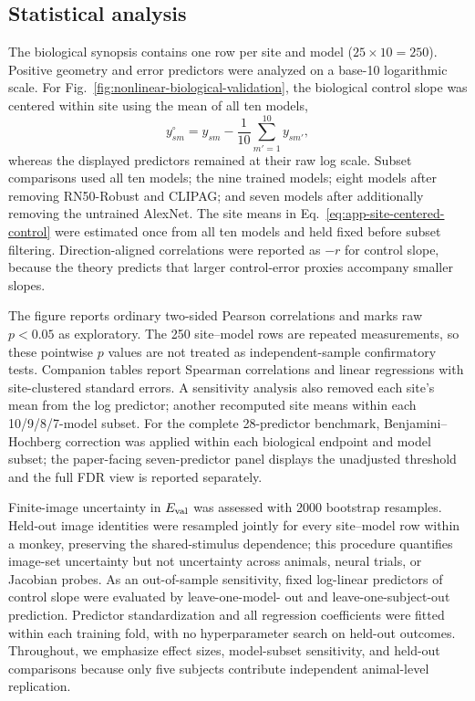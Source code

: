 \subsection{Statistical analysis}
\label{sec:app-methods-stats}
The biological synopsis contains one row per site and model ($25\times10=250$).
Positive geometry and error predictors were analyzed on a base-10 logarithmic
scale.  For Fig.~\ref{fig:nonlinear-biological-validation}, the biological
control slope was centered within site using the mean of all ten models,
\begin{equation}
 y^{\circ}_{sm}=y_{sm}-\frac{1}{10}\sum_{m'=1}^{10}y_{sm'},
 \label{eq:app-site-centered-control}
\end{equation}
whereas the displayed predictors remained at their raw log scale.  Subset
comparisons used all ten models; the nine trained models; eight models after
removing RN50-Robust and CLIPAG; and seven models after additionally removing
the untrained AlexNet.  The site means in
Eq.~\ref{eq:app-site-centered-control} were estimated once from all ten models
and held fixed before subset filtering.  Direction-aligned correlations were
reported as $-r$ for control slope, because the theory predicts that larger
control-error proxies accompany smaller slopes.

The figure reports ordinary two-sided Pearson correlations and marks raw
$p<0.05$ as exploratory.  The 250 site--model rows are repeated measurements,
so these pointwise $p$ values are not treated as independent-sample
confirmatory tests.  Companion tables report Spearman correlations and linear
regressions with site-clustered standard errors.  A sensitivity analysis also
removed each site's mean from the log predictor; another recomputed site means
within each 10/9/8/7-model subset.  For the complete 28-predictor benchmark,
Benjamini--Hochberg correction was applied within each biological endpoint and
model subset; the paper-facing seven-predictor panel displays the unadjusted
threshold and the full FDR view is reported separately.

Finite-image uncertainty in $E_{\rm val}$ was assessed with 2000 bootstrap
resamples.  Held-out image identities were resampled jointly for every
site--model row within a monkey, preserving the shared-stimulus dependence;
this procedure quantifies image-set uncertainty but not uncertainty across
animals, neural trials, or Jacobian probes.  As an out-of-sample sensitivity,
fixed log-linear predictors of control slope were evaluated by leave-one-model-
out and leave-one-subject-out prediction.  Predictor standardization and all
regression coefficients were fitted within each training fold, with no
hyperparameter search on held-out outcomes.  Throughout, we emphasize effect
sizes, model-subset sensitivity, and held-out comparisons because only five
subjects contribute independent animal-level replication.


